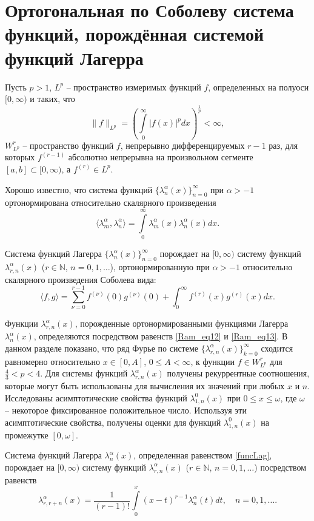 \section{Ортогональная по Соболеву система функций, порождённая системой функций Лагерра}
Пусть $p>1$, $L^p$ -- пространство измеримых функций $f$, определенных на полуоси $[0, \infty)$ и таких, что
$$
\|f\|_{L^p}=\left(\int\limits_0^{\infty}|f(x)|^pdx\right)^\frac{1}{p}<\infty,
$$
$W^r_{L^p}$ -- пространство функций $f$, непрерывно дифференцируемых $r-1$ раз, для которых $f^{(r-1)}$ абсолютно непрерывна на произвольном сегменте $[a, b]\subset[0, \infty)$, а $f^{(r)}\in L^p$.

Хорошо известно, что система функций $\{\lambda_n^\alpha(x)\}_{n=0}^\infty$ при $\alpha>-1$ ортонормирована относительно скалярного произведения
$$
\langle \lambda_m^\alpha, \lambda_n^\alpha\rangle=\int\limits_0^\infty \lambda_m^\alpha(x)\lambda_n^\alpha(x)dx.
$$

Система функций Лагерра $\{\lambda_n^\alpha(x)\}_{n=0}^\infty$ порождает на $[0, \infty)$ систему функций $\lambda_{r,n}^\alpha(x)$ ($r\in\mathbb{N}$, $n=0, 1, \ldots$), ортонормированную при $\alpha>-1$ относительно скалярного произведения Соболева вида:
\begin{equation}\label{Ram_eq1}
\langle f,g\rangle=\sum_{\nu=0}^{r-1}f^{(\nu)}(0)g^{(\nu)}(0)+\int_{0}^{\infty} f^{(r)}(x)g^{(r)}(x)dx.
\end{equation}

Функции $\lambda_{r,n}^{\alpha}(x)$, порожденные ортонормированными функциями Лагерра $\lambda_{n}^{\alpha}(x)$, определяются посредством равенств \eqref{Ram_eq12} и \eqref{Ram_eq13}.
В данном разделе показано, что ряд Фурье по системе $\{\lambda_{r,n}^{\alpha}(x)\}_{k=0}^\infty$ сходится равномерно относительно $x\in[0, A]$, $0\leq A<\infty$, к функции $f\in W^r_{L^p}$ для $\frac{4}{3}<p<4$.
Для системы функций $\lambda_{r,n}^{\alpha}(x)$ получены рекуррентные соотношения, которые могут быть использованы для вычисления их значений при любых $x$ и $n$.
Исследованы асимптотические свойства функций $\lambda_{1,n}^0(x)$ при $0\leq x\leq\omega$, где $\omega$ -- некоторое фиксированное положительное число. Используя эти асимптотические свойства, получены оценки для функций $\lambda_{1,n}^0(x)$ на промежутке $[0,\omega]$.

Система функций Лагерра $\lambda_n^\alpha(x)$, определенная равенством \eqref{funcLag}, порождает на $[0, \infty)$ систему функций $\lambda_{r,n}^\alpha(x)$ ($r\in\mathbb{N}$, $n=0, 1, \ldots$) посредством равенств
\begin{equation}\label{Ram_eq12}
\lambda_{r,r+n}^{\alpha}(x) =\frac{1}{(r-1)!}\int\limits_{0}^x(x-t)^{r-1}\lambda_{n}^{\alpha}(t)dt, \quad n=0,1,\ldots.
\end{equation}

